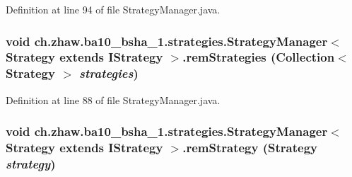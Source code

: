 Definition at line 94 of file StrategyManager.java.\hypertarget{classch_1_1zhaw_1_1ba10__bsha__1_1_1strategies_1_1StrategyManager_3_01Strategy_01extends_01IStrategy_01_4_a9806653412de5dd6db7e92eb86952302}{
\subsubsection[{remStrategies}]{\setlength{\rightskip}{0pt plus 5cm}void ch.zhaw.ba10\_\-bsha\_\-1.strategies.StrategyManager$<$ Strategy extends {\bf IStrategy} $>$.remStrategies (Collection$<$ Strategy $>$ {\em strategies})}}
\label{classch_1_1zhaw_1_1ba10__bsha__1_1_1strategies_1_1StrategyManager_3_01Strategy_01extends_01IStrategy_01_4_a9806653412de5dd6db7e92eb86952302}


Definition at line 88 of file StrategyManager.java.\hypertarget{classch_1_1zhaw_1_1ba10__bsha__1_1_1strategies_1_1StrategyManager_3_01Strategy_01extends_01IStrategy_01_4_a16db5f59ae5a1b7c74ac1badeafa71eb}{
\subsubsection[{remStrategy}]{\setlength{\rightskip}{0pt plus 5cm}void ch.zhaw.ba10\_\-bsha\_\-1.strategies.StrategyManager$<$ Strategy extends {\bf IStrategy} $>$.remStrategy (Strategy {\em strategy})}}
\label{classch_1_1zhaw_1_1ba10__bsha__1_1_1strategies_1_1StrategyManager_3_01Strategy_01extends_01IStrategy_01_4_a16db5f59ae5a1b7c74ac1badeafa71eb}


